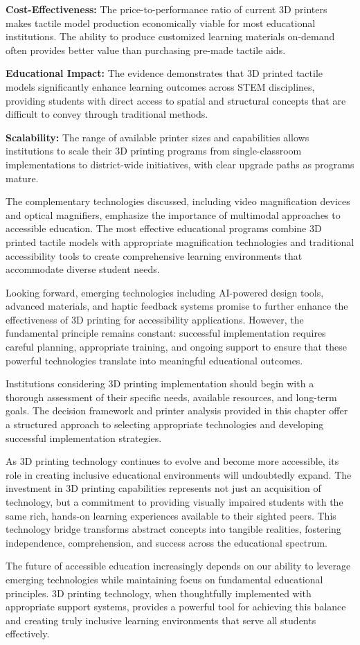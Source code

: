 \textbf{Cost-Effectiveness:} The price-to-performance ratio of current 3D printers makes tactile model production economically viable for most educational institutions. The ability to produce customized learning materials on-demand often provides better value than purchasing pre-made tactile aids.

\textbf{Educational Impact:} The evidence demonstrates that 3D printed tactile models significantly enhance learning outcomes across STEM disciplines, providing students with direct access to spatial and structural concepts that are difficult to convey through traditional methods.

\textbf{Scalability:} The range of available printer sizes and capabilities allows institutions to scale their 3D printing programs from single-classroom implementations to district-wide initiatives, with clear upgrade paths as programs mature.

The complementary technologies discussed, including video magnification devices and optical magnifiers, emphasize the importance of multimodal approaches to accessible education. The most effective educational programs combine 3D printed tactile models with appropriate magnification technologies and traditional accessibility tools to create comprehensive learning environments that accommodate diverse student needs.

Looking forward, emerging technologies including AI-powered design tools, advanced materials, and haptic feedback systems promise to further enhance the effectiveness of 3D printing for accessibility applications. However, the fundamental principle remains constant: successful implementation requires careful planning, appropriate training, and ongoing support to ensure that these powerful technologies translate into meaningful educational outcomes.

Institutions considering 3D printing implementation should begin with a thorough assessment of their specific needs, available resources, and long-term goals. The decision framework and printer analysis provided in this chapter offer a structured approach to selecting appropriate technologies and developing successful implementation strategies.

As 3D printing technology continues to evolve and become more accessible, its role in creating inclusive educational environments will undoubtedly expand. The investment in 3D printing capabilities represents not just an acquisition of technology, but a commitment to providing visually impaired students with the same rich, hands-on learning experiences available to their sighted peers. This technology bridge transforms abstract concepts into tangible realities, fostering independence, comprehension, and success across the educational spectrum.

The future of accessible education increasingly depends on our ability to leverage emerging technologies while maintaining focus on fundamental educational principles. 3D printing technology, when thoughtfully implemented with appropriate support systems, provides a powerful tool for achieving this balance and creating truly inclusive learning environments that serve all students effectively.